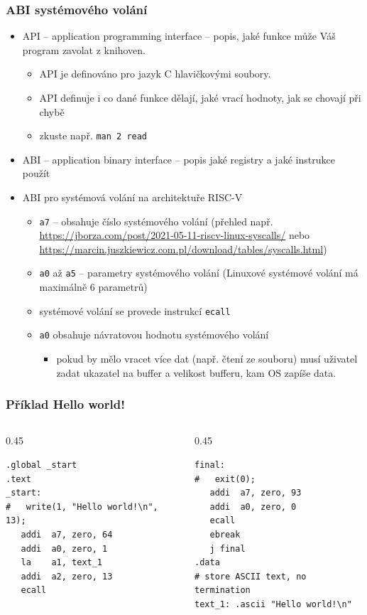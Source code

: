\documentclass[aspectratio=169]{beamer}
\begin{document}
\begin{frame}[shrink=5]
\frametitle{ABI systémového volání}

\begin{itemize}
\item API -- application programming interface -- popis, jaké funkce může Váš program zavolat z knihoven.
\begin{itemize}
\item API je definováno pro jazyk C hlavičkovými soubory.
\item API definuje i co dané funkce dělají, jaké vrací hodnoty, jak se chovají při chybě
\item zkuste např. \texttt{man 2 read}
\end{itemize}
\item ABI -- application binary interface -- popis jaké registry a jaké instrukce použít
\item ABI pro systémová volání na architektuře RISC-V
\begin{itemize}
\item \texttt{a7} -- obsahuje číslo systémového volání (přehled např. \url{https://jborza.com/post/2021-05-11-riscv-linux-syscalls/} nebo \url{https://marcin.juszkiewicz.com.pl/download/tables/syscalls.html})
\item \texttt{a0} až \texttt{a5} -- parametry systémového volání (Linuxové systémové volání má maximálně 6 parametrů)
\item systémové volání se provede instrukcí \texttt{ecall}
\item \texttt{a0} obsahuje návratovou hodnotu systémového volání
\begin{itemize}
\item pokud by mělo vracet více dat (např. čtení ze souboru) musí uživatel zadat ukazatel na buffer a velikost bufferu, kam OS zapíše data.
\end{itemize}
\end{itemize}
\end{itemize}
\end{frame}

\begin{frame}[fragile]
\frametitle{Příklad Hello world!}
\begin{columns}
\begin{column}{0.45\textwidth}
\begin{verbatim}
.global _start
.text
_start:
#   write(1, "Hello world!\n", 13);
   addi  a7, zero, 64
   addi  a0, zero, 1
   la    a1, text_1
   addi  a2, zero, 13
   ecall
\end{verbatim}
\end{column}
\hfill
\begin{column}{0.45\textwidth}
\begin{verbatim}
final:
#   exit(0);
   addi  a7, zero, 93
   addi  a0, zero, 0
   ecall
   ebreak
   j final
.data
# store ASCII text, no termination
text_1: .ascii "Hello world!\n"
\end{verbatim}
\end{column}
\end{columns}
\end{frame}
\end{document}
